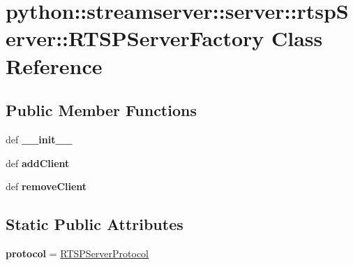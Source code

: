 \hypertarget{classpython_1_1streamserver_1_1server_1_1rtspServer_1_1RTSPServerFactory}{
\section{python::streamserver::server::rtspServer::RTSPServerFactory Class Reference}
\label{classpython_1_1streamserver_1_1server_1_1rtspServer_1_1RTSPServerFactory}
}
\subsection*{Public Member Functions}
\begin{DoxyCompactItemize}
\item 
\hypertarget{classpython_1_1streamserver_1_1server_1_1rtspServer_1_1RTSPServerFactory_a269d6d7e93929515167e039aa48f1076}{
def {\bfseries \_\-\_\-init\_\-\_\-}}
\label{classpython_1_1streamserver_1_1server_1_1rtspServer_1_1RTSPServerFactory_a269d6d7e93929515167e039aa48f1076}

\item 
\hypertarget{classpython_1_1streamserver_1_1server_1_1rtspServer_1_1RTSPServerFactory_abcb503110bc2aca680bfb2567aff85d1}{
def {\bfseries addClient}}
\label{classpython_1_1streamserver_1_1server_1_1rtspServer_1_1RTSPServerFactory_abcb503110bc2aca680bfb2567aff85d1}

\item 
\hypertarget{classpython_1_1streamserver_1_1server_1_1rtspServer_1_1RTSPServerFactory_a90cc663e1fb67bca94fe0158e4e46a6b}{
def {\bfseries removeClient}}
\label{classpython_1_1streamserver_1_1server_1_1rtspServer_1_1RTSPServerFactory_a90cc663e1fb67bca94fe0158e4e46a6b}

\end{DoxyCompactItemize}
\subsection*{Static Public Attributes}
\begin{DoxyCompactItemize}
\item 
\hypertarget{classpython_1_1streamserver_1_1server_1_1rtspServer_1_1RTSPServerFactory_a83b47e3bcada9bd443ea8dc51873d9ec}{
{\bfseries protocol} = \hyperlink{classpython_1_1streamserver_1_1server_1_1rtspServer_1_1RTSPServerProtocol}{RTSPServerProtocol}}
\label{classpython_1_1streamserver_1_1server_1_1rtspServer_1_1RTSPServerFactory_a83b47e3bcada9bd443ea8dc51873d9ec}

\end{DoxyCompactItemize}


